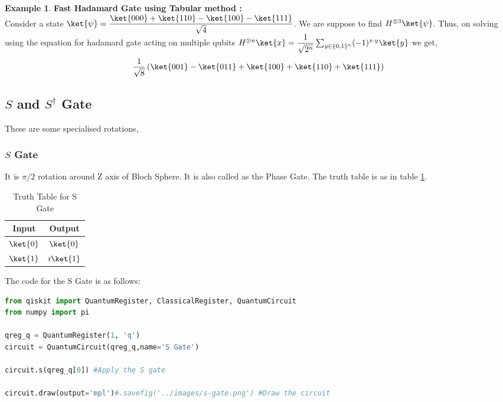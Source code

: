 \documentclass[12pt, oneside]{book}
\theoremstyle{definition}
\theoremstyle{definition}
\newtheorem{example}{Example}[section]
\theoremstyle{remark}
\begin{document}
\begin{example}
    \textbf{Fast Hadamard Gate using Tabular method :}\\
    Consider a state $\ket{\psi}=\dfrac{\ket{000}+\ket{110}-\ket{100}-\ket{111}}{\sqrt{4}}$. We are suppose to find
    $H^{\otimes 3}\ket{\psi}$. Thus, on solving using the equation for hadamard gate acting on multiple qubits $H^{\otimes n}\ket{x}=\dfrac{1}{\sqrt{2^n}}\sum_{y \in \{0,1\}^n}(-1)^{x\cdot y}\ket{y}$ 
    we get,
    \[
        \frac{1}{\sqrt{8}}\left(\ket{001}-\ket{011}+\ket{100}+\ket{110}+\ket{111}\right)
    \]
\end{example}

\subsection{\texorpdfstring{$S$ and $S^{\dagger}$ Gate}{S and S^\dagger Gate}}
These are some specialised rotations,
\subsubsection{$S$ Gate}
It is $\pi/2$ rotation around Z axis of Bloch Sphere.
It is also called as the Phase Gate. The truth table is as in table \ref{tab:s}.
\begin{table}[H]
    \centering
    \begin{tabular}{|c|c|}
        \hline
        Input & Output\\
        \hline
        $\ket{0}$ & $\ket{0}$\\
        $\ket{1}$ & $i\ket{1}$\\
        \hline
    \end{tabular}
    \caption{Truth Table for S Gate}
    \label{tab:s}
\end{table}
The code for the S Gate is as follows:
\begin{lstlisting}[language=Python]
from qiskit import QuantumRegister, ClassicalRegister, QuantumCircuit
from numpy import pi

qreg_q = QuantumRegister(1, 'q')
circuit = QuantumCircuit(qreg_q,name='S Gate')

circuit.s(qreg_q[0]) #Apply the S gate

circuit.draw(output='mpl')#.savefig('../images/s-gate.png') #Draw the circuit
\end{lstlisting}
\end{document}
